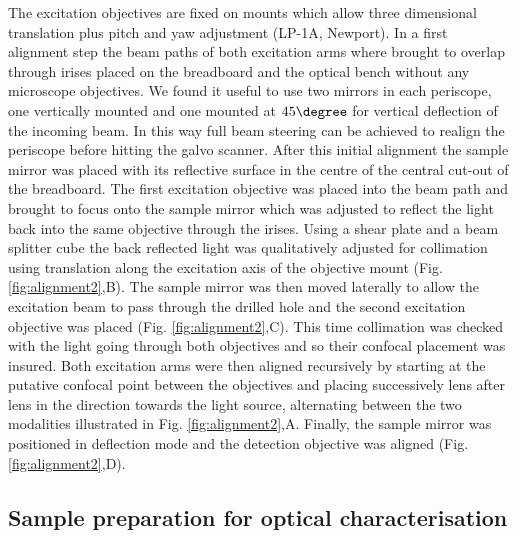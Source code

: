\documentclass[12pt]{spieman}  %
\begin{document}
\begin{spacing}{2}
The excitation objectives are fixed on mounts which allow three dimensional translation plus pitch and yaw adjustment (LP-1A, Newport). In a first alignment step the beam paths of both excitation arms where brought to overlap through irises placed on the breadboard and the optical bench without any microscope objectives. We found it useful to use two mirrors in each periscope, one vertically mounted and one mounted at $45\degree$ for vertical deflection of the incoming beam. In this way full beam steering can be achieved to realign the periscope before hitting the galvo scanner. After this initial alignment the sample mirror was placed with its reflective surface in the centre of the central cut-out of the breadboard. The first excitation objective was placed into the beam path and brought to focus onto the sample mirror which was adjusted to reflect the light back into the same objective through the irises. Using a shear plate and a beam splitter cube the back reflected light was qualitatively adjusted for collimation using translation along the excitation axis of the objective mount (Fig. \ref{fig:alignment2},B). The sample mirror was then moved laterally to allow the excitation beam to pass through the drilled hole and the second excitation objective was placed (Fig. \ref{fig:alignment2},C). This time collimation was checked with the light going through both objectives and so their confocal placement was insured. Both excitation arms were then aligned recursively by starting at the putative confocal point between the objectives and placing successively lens after lens in the direction towards the light source, alternating between the two modalities illustrated in Fig. \ref{fig:alignment2},A. Finally, the sample mirror was positioned in deflection mode and the detection objective was aligned (Fig. \ref{fig:alignment2},D). 

\subsection{Sample preparation for optical characterisation}


\end{spacing}
\end{document}
